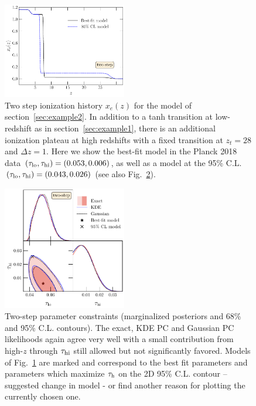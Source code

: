 \documentclass[prd,twocolumn,amsmath,amssymb,floatfix,superscriptaddress,nofootinbib]{revtex4-1}
\newcommand{\refsec}[1]{section~\ref{sec:#1}}
\newcommand{\tauhi}{\tau_{\rm hi}}
\newcommand{\taulo}{\tau_{\rm lo}}
\begin{document}
\begin{figure}
\includegraphics[width=0.48\textwidth]{paper/plots/plot_xe_tanh_highz.pdf}
\caption{Two step ionization history $x_e(z)$ for the model of \refsec{example2}. In addition to a tanh transition at low-redshift as in \refsec{example1}, there is an additional ionization plateau at high redshifts with a fixed transition at $z_t = 28$ and $\Delta z = 1$. Here we show the best-fit model in the Planck 2018 data $(\taulo, \tauhi) = (0.053, 0.006)$, as well as  a model at the 95\% C.L. $(\taulo, \tauhi) = (0.043, 0.026)$ (see also Fig.~\ref{fig:two_parameter_model_2D}). }
\label{fig:two_step_model}
\end{figure}

%
%

\begin{figure}[t]
%
%
\includegraphics[width=0.48\textwidth]{paper/plots/pl18_tanh_highz_test7_run1_vs_relike_tanh_highz_test9_run5_f0p14_taulo_prior_0p03_zre_prior_6p1_taulo_prior_0p0_tri.pdf}
\caption{Two-step parameter constraints (marginalized posteriors and 68\% and 95\% C.L. contours).  The exact, KDE PC and Gaussian PC likelihoods again agree very well with a small contribution from high-$z$ through $\tau_{\rm hi}$ still allowed but not significantly favored.   Models of Fig.~\ref{fig:two_step_model} are marked and correspond to the best fit parameters and parameters 
which maximize $\tau_{\rm h}$ on the 2D 95\% C.L. contour --
suggested change in model - or find another reason for plotting the currently chosen one.
}
\label{fig:two_parameter_model_2D}
\end{figure}
\end{document}
